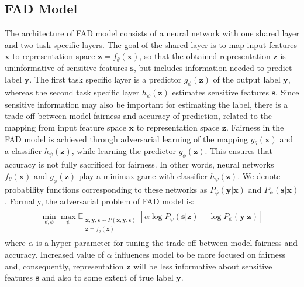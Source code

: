 \documentclass[preprint,12pt]{elsarticle}
\begin{document}
\subsection{FAD Model}

The architecture of FAD model consists of a neural network with one shared layer and two task specific layers.  The goal of the shared layer is to map input features $\mathbf{x}$ to representation space $\mathbf{z}=f_\theta(\mathbf{x})$, so that the obtained representation $\mathbf{z}$ is uninformative of sensitive features $\mathbf{s}$, but includes information needed to predict label $\mathbf{y}$. The first task specific layer is a predictor $g_\phi(\mathbf{z})$ of the output label $\mathbf{y}$, whereas the second task specific layer $h_\psi(\mathbf{z})$ estimates sensitive features $\mathbf{s}$. Since sensitive information may also be important for estimating the label, there is a trade-off between model fairness and accuracy of prediction, related to the mapping from input feature space $\mathbf{x}$ to representation space $\mathbf{z}$.
Fairness in the FAD model is achieved through adversarial learning of the mapping $g_\theta(\mathbf{x})$ and a classifier $h_\psi(\mathbf{z})$, while learning the predictor $g_\phi(\mathbf{z})$. This ensures that accuracy is not fully sacrificed for fairness. In other words, neural networks $f_\theta(\mathbf{x})$ and $g_\phi(\mathbf{z})$ play a minimax game with classifier $h_\psi(\mathbf{z})$. We denote probability functions corresponding to these networks as $P_\phi(\mathbf{y}|\mathbf{x})$ and $P_\psi(\mathbf{s}|\mathbf{x})$. Formally, the adversarial problem of FAD model is:
\begin{gather*}
\begin{split}
\min_{\theta,\phi}\max_{\psi} \mathbb{E}_{\substack{\mathbf{x},\mathbf{y},\mathbf{s} \sim P(\mathbf{x},\mathbf{y},\mathbf{s})\\\mathbf{z}=f_\theta(\mathbf{x})}} \left[\alpha\log P_{\psi}(\mathbf{s}|\mathbf{z}) - \log P_{\phi}(\mathbf{y}|\mathbf{z})\right]
\end{split}
\end{gather*}
where $\alpha$ is a hyper-parameter for tuning the trade-off between model fairness and accuracy. Increased value of $\alpha$ influences model to be more focused on fairness and, consequently, representation $\mathbf{z}$ will be less informative about sensitive features $\mathbf{s}$ and also to some extent of true label $\mathbf{y}$. 
\end{document}
